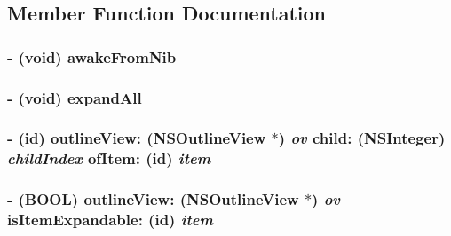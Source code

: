 \subsection{Member Function Documentation}
\hypertarget{interface_c_m_source_list_controller_677c7a66e0298c1edfc00d1251134415}{
\subsubsection[awakeFromNib]{\setlength{\rightskip}{0pt plus 5cm}- (void) awakeFromNib }}
\label{interface_c_m_source_list_controller_677c7a66e0298c1edfc00d1251134415}


\hypertarget{interface_c_m_source_list_controller_aef5e556c40b91df8096bd841293c37f}{
\subsubsection[expandAll]{\setlength{\rightskip}{0pt plus 5cm}- (void) expandAll }}
\label{interface_c_m_source_list_controller_aef5e556c40b91df8096bd841293c37f}


\hypertarget{interface_c_m_source_list_controller_413c1e8e88baf3f11ee129d9c6f4affe}{
\subsubsection[outlineView:child:ofItem:]{\setlength{\rightskip}{0pt plus 5cm}- (id) outlineView: (NSOutlineView $\ast$) {\em ov}\/ child: (NSInteger) {\em childIndex}\/ ofItem: (id) {\em item}}}
\label{interface_c_m_source_list_controller_413c1e8e88baf3f11ee129d9c6f4affe}


\hypertarget{interface_c_m_source_list_controller_849b93a679db8f1ce7a36f21b560f20f}{
\subsubsection[outlineView:isItemExpandable:]{\setlength{\rightskip}{0pt plus 5cm}- (BOOL) outlineView: (NSOutlineView $\ast$) {\em ov}\/ isItemExpandable: (id) {\em item}}}
\label{interface_c_m_source_list_controller_849b93a679db8f1ce7a36f21b560f20f}


